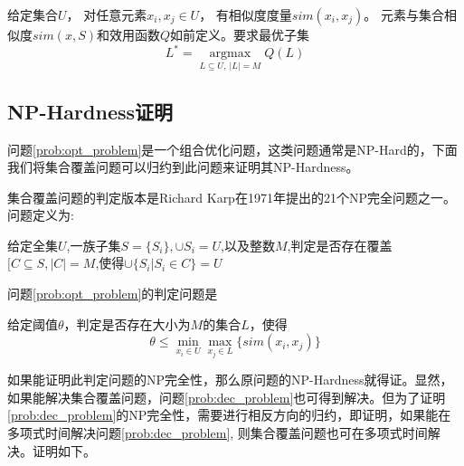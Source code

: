 \begin{problem}
\label{prob:opt_problem}
给定集合$U$， 对任意元素$x_i, x_j \in U$， 有相似度度量$sim(x_i,x_j)$。 元素与集合相似度$sim(x, S)$和效用函数$Q$如前定义。要求最优子集
\[
        {L^*} = \mathop {\arg \max }\limits_{L \subseteq U, \ |L| = M} Q(L)
\]
\end{problem}

\subsection{NP-Hardness证明}
\label{sec:nph}
问题\ref{prob:opt_problem}是一个组合优化问题，这类问题通常是NP-Hard的，下面我们将集合覆盖问题可以归约到此问题来证明其NP-Hardness。

集合覆盖问题的判定版本是Richard Karp在1971年提出的21个NP完全问题之一。问题定义为:

\begin{problem}[集合覆盖]
\label{prob:set_cover}
给定全集$U$,一族子集$S=\{S_i\}, \cup {S_i} = U$,以及整数$M$,判定是否存在覆盖$[C \subseteq S,|C|=M$,使得$\cup \{ {S_i}|{S_i} \in C\}  = U$
\end{problem}

问题\ref{prob:opt_problem}的判定问题是
\begin{problem}
\label{prob:dec_problem}
给定阈值$\theta$，判定是否存在大小为$M$的集合$L$，使得
\[
    \theta  \le \mathop {\min }\limits_{{x_i} \in U} \mathop {\max }\limits_{{x_j} \in L} \{ sim({x_i},{x_j})\} 
\]
\end{problem}

如果能证明此判定问题的NP完全性，那么原问题的NP-Hardness就得证。显然，如果能解决集合覆盖问题，问题\ref{prob:dec_problem}也可得到解决。但为了证明\ref{prob:dec_problem}的NP完全性，需要进行相反方向的归约，即证明，如果能在多项式时间解决问题\ref{prob:dec_problem}, 则集合覆盖问题也可在多项式时间解决。证明如下。

